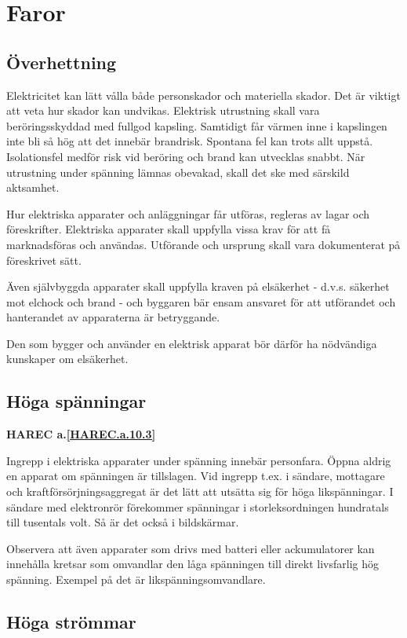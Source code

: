 \section{Faror}

\subsection{Överhettning}

Elektricitet kan lätt vålla både personskador och materiella
skador. Det är viktigt att veta hur skador kan undvikas. Elektrisk
utrustning skall vara beröringsskyddad med fullgod kapsling. Samtidigt
får värmen inne i kapslingen inte bli så hög att det innebär
brandrisk. Spontana fel kan trots allt uppstå.  Isolationsfel medför
risk vid beröring och brand kan utvecklas snabbt. När utrustning under
spänning lämnas obevakad, skall det ske med särskild aktsamhet.

Hur elektriska apparater och anläggningar får utföras, regleras av
lagar och föreskrifter. Elektriska apparater skall uppfylla vissa krav
för att få marknadsföras och användas. Utförande och ursprung skall
vara dokumenterat på föreskrivet sätt.

Även självbyggda apparater skall uppfylla kraven på elsäkerhet -
d.v.s. säkerhet mot elchock och brand - och byggaren bär ensam
ansvaret för att utförandet och hanterandet av apparaterna är
betryggande.

Den som bygger och använder en elektrisk apparat bör därför ha
nödvändiga kunskaper om elsäkerhet.

\subsection{Höga spänningar}
\textbf{
HAREC a.\ref{HAREC.a.10.3}\label{myHAREC.a.10.3}
}

Ingrepp i elektriska apparater under spänning innebär
personfara. Öppna aldrig en apparat om spänningen är tillslagen. Vid
ingrepp t.ex. i sändare, mottagare och kraftförsörjningsaggregat är
det lätt att utsätta sig för höga likspänningar. I sändare med
elektronrör förekommer spänningar i storleksordningen hundratals till
tusentals volt. Så är det också i bildskärmar.

Observera att även apparater som drivs med batteri eller ackumulatorer
kan innehålla kretsar som omvandlar den låga spänningen till direkt
livsfarlig hög spänning. Exempel på det är likspänningsomvandlare.

\subsection{Höga strömmar}

